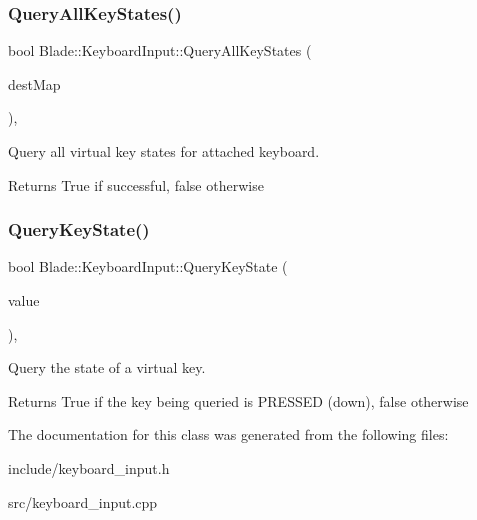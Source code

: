\subsubsection{\texorpdfstring{Query\+All\+Key\+States()}{QueryAllKeyStates()}}
{\footnotesize\ttfamily bool Blade\+::\+Keyboard\+Input\+::\+Query\+All\+Key\+States (\begin{DoxyParamCaption}\item[{std\+::map$<$ Virtual\+Key, bool $>$ \&}]{dest\+Map }\end{DoxyParamCaption})\hspace{0.3cm}{\ttfamily [static]}, {\ttfamily [noexcept]}}



Query all virtual key states for attached keyboard. 

\begin{DoxyReturn}{Returns}
True if successful, false otherwise 
\end{DoxyReturn}
\mbox{\label{class_blade_1_1_keyboard_input_a9430c44501f4c2a4c3550be2b4bc05d0}} 
\subsubsection{\texorpdfstring{Query\+Key\+State()}{QueryKeyState()}}
{\footnotesize\ttfamily bool Blade\+::\+Keyboard\+Input\+::\+Query\+Key\+State (\begin{DoxyParamCaption}\item[{Virtual\+Key}]{value }\end{DoxyParamCaption})\hspace{0.3cm}{\ttfamily [static]}, {\ttfamily [noexcept]}}



Query the state of a virtual key. 

\begin{DoxyReturn}{Returns}
True if the key being queried is P\+R\+E\+S\+S\+ED (down), false otherwise 
\end{DoxyReturn}


The documentation for this class was generated from the following files\+:\begin{DoxyCompactItemize}
\item 
include/keyboard\+\_\+input.\+h\item 
src/keyboard\+\_\+input.\+cpp\end{DoxyCompactItemize}
